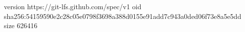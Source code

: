 version https://git-lfs.github.com/spec/v1
oid sha256:54159590e2c28c05e0798f3698a388d0155e91add7c943a0ded06f73e8a5e5dd
size 626416
